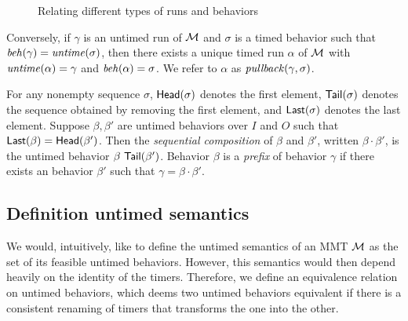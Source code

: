 \begin{figure}[h]
\centering
{}
\caption{Relating different types of runs and behaviors}
\label{fig:diagram}
\end{figure}
\fi
Conversely, if $\gamma$ is an untimed run  of ${\mathcal M}$ and $\sigma$ is a timed behavior such that $\mathit{beh}(\gamma) = \mathit{untime}(\sigma)$,
then there exists a unique timed run $\alpha$ of ${\mathcal M}$ with $\mathit{untime}(\alpha) = \gamma$ and $\mathit{beh}(\alpha) = \sigma$.
We refer to $\alpha$ as $\mathit{pullback}(\gamma,\sigma)$.

For any nonempty sequence $\sigma$, $\mathsf{Head}({\sigma})$ denotes the first element, $\mathsf{Tail}({\sigma})$ denotes the sequence obtained by removing the first element, and $\mathsf{Last}({\sigma})$ denotes the last element.
Suppose $\beta, \beta'$ are untimed behaviors over $I$ and $O$ such that $\mathsf{Last}({\beta}) = \mathsf{Head}({\beta'})$.
Then the \emph{sequential composition} of $\beta$ and $\beta'$, written $\beta \cdot \beta'$, is the untimed behavior $\beta ~ \mathsf{Tail}({\beta'})$.
Behavior $\beta$ is a \emph{prefix} of behavior $\gamma$ if there exists an behavior $\beta'$ such that $\gamma = \beta \cdot \beta'$.

\subsection{Definition untimed semantics}
We would, intuitively, like to define the untimed semantics of an MMT ${\mathcal M}$ as the set of its feasible untimed behaviors.
However, this semantics would then depend heavily on the identity of the timers. Therefore, we define an equivalence relation
on untimed behaviors, which deems two untimed behaviors equivalent if there is a consistent renaming of timers that transforms
the one into the other.


